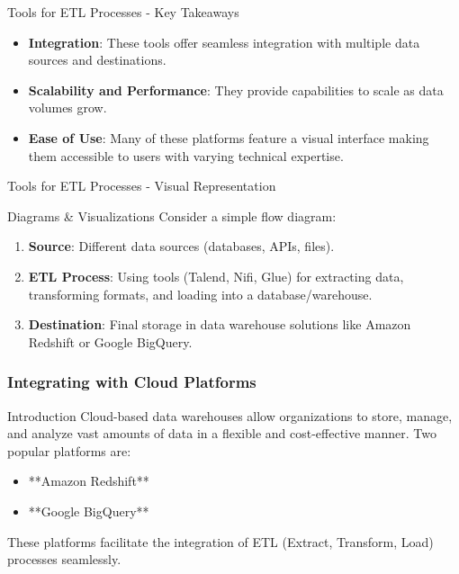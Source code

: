 \documentclass[aspectratio=169]{beamer}
\begin{document}
\begin{frame}[fragile]{Tools for ETL Processes - Key Takeaways}
  \begin{itemize}
    \item \textbf{Integration}: These tools offer seamless integration with multiple data sources and destinations.
    \item \textbf{Scalability and Performance}: They provide capabilities to scale as data volumes grow.
    \item \textbf{Ease of Use}: Many of these platforms feature a visual interface making them accessible to users with varying technical expertise.
  \end{itemize}
\end{frame}

\begin{frame}[fragile]{Tools for ETL Processes - Visual Representation}
  \begin{block}{Diagrams \& Visualizations}
    Consider a simple flow diagram:
    \begin{enumerate}
      \item \textbf{Source}: Different data sources (databases, APIs, files).
      \item \textbf{ETL Process}: Using tools (Talend, Nifi, Glue) for extracting data, transforming formats, and loading into a database/warehouse.
      \item \textbf{Destination}: Final storage in data warehouse solutions like Amazon Redshift or Google BigQuery.
    \end{enumerate}
  \end{block}
\end{frame}

\begin{frame}[fragile]
    \frametitle{Integrating with Cloud Platforms}
    \begin{block}{Introduction}
        Cloud-based data warehouses allow organizations to store, manage, and analyze vast amounts of data in a flexible and cost-effective manner. Two popular platforms are:
    \end{block}
    \begin{itemize}
        \item **Amazon Redshift**
        \item **Google BigQuery**
    \end{itemize}
    These platforms facilitate the integration of ETL (Extract, Transform, Load) processes seamlessly.
\end{frame}
\end{document}
